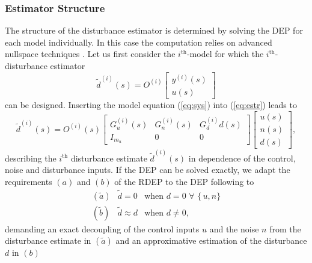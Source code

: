 \documentclass[graybox]{svmult}
\begin{document}
\subsubsection{Estimator Structure}\label{sec:strc}\vspace{-1mm}
The structure of the disturbance estimator is determined by solving the DEP \cite{Ossmann18ccta} for each model individually. In this case the computation relies on advanced nullspace techniques \cite{Varga17}. Let us first consider the $i^{\text{th}}$-model  for which the  $i^{\text{th}}$- disturbance  estimator 
\begin{equation}\label{eq:estr}
\tilde d^{(i)}(s) =  O^{(i)}
\begin{bmatrix}
y^{(i)}(s) \\ u(s)
\end{bmatrix}
\end{equation}
can be designed.
Inserting the  model equation (\ref{eq:sys})  into (\ref{eq:estr}) leads to
\begin{equation}\label{eq:full}
\tilde d^{(i)}(s) = O^{(i)}(s) 
\begin{bmatrix}
G_u^{(i)}(s) & G_{n}^{(i)}(s) & G_d^{(i)}d(s) \\ I_{m_u}& 0 & 0
\end{bmatrix}
\begin{bmatrix}
u(s) \\ n(s) \\ d(s)
\end{bmatrix},
\end{equation}
describing the  $i^{\text{th}}$ disturbance estimate $\tilde d^{(i)}(s)$ in dependence of the control, noise and disturbance inputs.  If the DEP can be solved exactly, we adapt the requirements $(a)$ and $(b)$ of the RDEP to the DEP following \cite{Ossmann18ccta} to
\begin{equation}
\begin{array}{lll}
(\tilde a) & \tilde d = 0 & \text{when } d = 0  \,\, \forall  \,\, \{\, u, n \}\\ 
(\tilde b) &\tilde d \approx d & \text{when } d \neq 0, 
\end{array}
\end{equation}
demanding an exact decoupling of the control inputs $u$ and the noise $n$ from the disturbance estimate in $(\tilde a)$ and an approximative estimation of the disturbance $d$ in $(b)$ 
\end{document}
